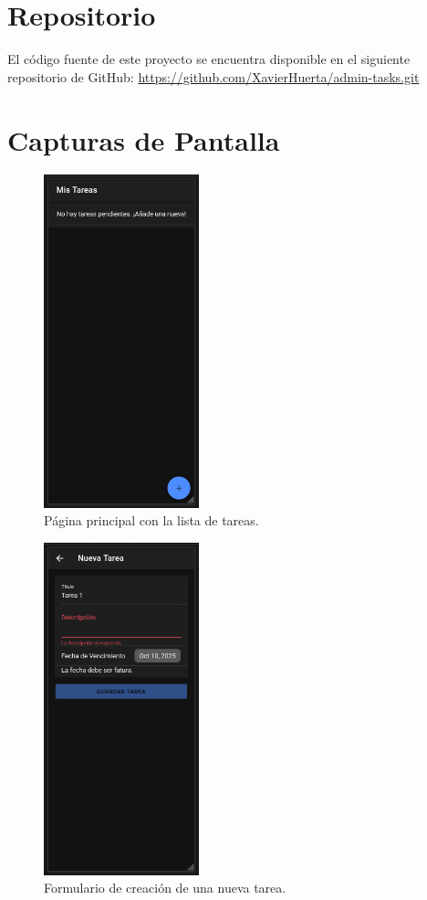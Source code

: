 \documentclass{article}
\begin{document}
\section{Repositorio}
El código fuente de este proyecto se encuentra disponible en el siguiente repositorio de GitHub:
\url{https://github.com/XavierHuerta/admin-tasks.git}


\section{Capturas de Pantalla}

\begin{figure}[htbp]
\centering
\includegraphics[width=0.4\textwidth]{captura_home.png}
\caption{Página principal con la lista de tareas.}
\end{figure}

\begin{figure}[htbp]
\centering
\includegraphics[width=0.4\textwidth]{captura_crear.png}
\caption{Formulario de creación de una nueva tarea.}
\end{figure}
\end{document}

